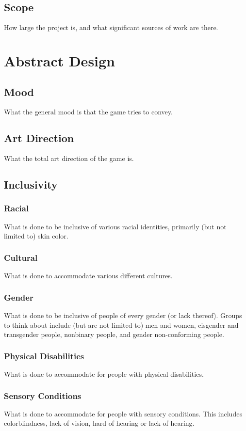 \subsection{Scope}
How large the project is, and what significant sources of work are there.

\section{Abstract Design}
\subsection{Mood}
What the general mood is that the game tries to convey.
\subsection{Art Direction}
What the total art direction of the game is.
\subsection{Inclusivity}
\subsubsection{Racial}
What is done to be inclusive of various racial identities, primarily (but not limited to) skin color.
\subsubsection{Cultural}
What is done to accommodate various different cultures.
\subsubsection{Gender}
What is done to be inclusive of people of every gender (or lack thereof). Groups to think about include (but are not limited to) men and women, cisgender and transgender people, nonbinary people, and gender non-conforming people.
\subsubsection{Physical Disabilities}
What is done to accommodate for people with physical disabilities.
\subsubsection{Sensory Conditions}
What is done to accommodate for people with sensory conditions. This includes colorblindness, lack of vision, hard of hearing or lack of hearing.

